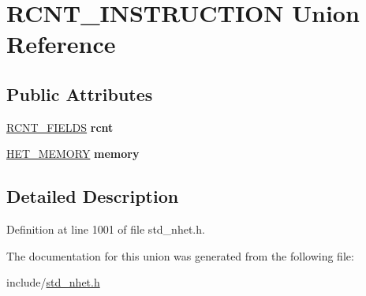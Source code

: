 \hypertarget{unionRCNT__INSTRUCTION}{}\section{R\+C\+N\+T\+\_\+\+I\+N\+S\+T\+R\+U\+C\+T\+I\+ON Union Reference}
\label{unionRCNT__INSTRUCTION}
\subsection*{Public Attributes}
\begin{DoxyCompactItemize}
\item 
\mbox{\label{unionRCNT__INSTRUCTION_abd1c49980cb531dccd1911e345b2bf51}} 
\mbox{\hyperlink{structrcnt__format}{R\+C\+N\+T\+\_\+\+F\+I\+E\+L\+DS}} {\bfseries rcnt}
\item 
\mbox{\label{unionRCNT__INSTRUCTION_a8e518cd12fe666888162636bf5e33469}} 
\mbox{\hyperlink{structmemory__format}{H\+E\+T\+\_\+\+M\+E\+M\+O\+RY}} {\bfseries memory}
\end{DoxyCompactItemize}


\subsection{Detailed Description}


Definition at line 1001 of file std\+\_\+nhet.\+h.



The documentation for this union was generated from the following file\+:\begin{DoxyCompactItemize}
\item 
include/\mbox{\hyperlink{std__nhet_8h}{std\+\_\+nhet.\+h}}\end{DoxyCompactItemize}
